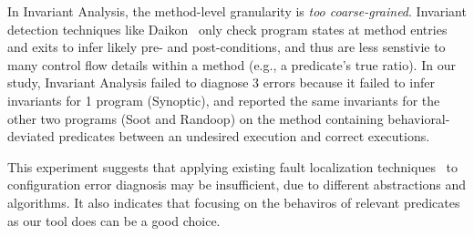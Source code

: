 In Invariant Analysis, the method-level granularity is \textit{too coarse-grained}.
Invariant detection techniques like Daikon~\cite{Ernst:1999}
only check program states at method entries and exits to infer
likely pre- and post-conditions, and thus are less
senstivie to many control flow details within a method (e.g., a predicate's
true ratio). In our study, Invariant Analysis failed to diagnose 3
errors because it failed to infer invariants for 1 program (Synoptic),
and reported the same invariants for the other two programs (Soot and Randoop)
on the method containing behavioral-deviated predicates between an undesired execution and correct executions.





This experiment suggests that applying existing fault localization
techniques~\cite{Jones:2002, McCamant:2003} to configuration error diagnosis may be insufficient, due
to different abstractions and algorithms. It also indicates that
focusing on the behaviros of relevant predicates as our tool does
 can be a good choice.
